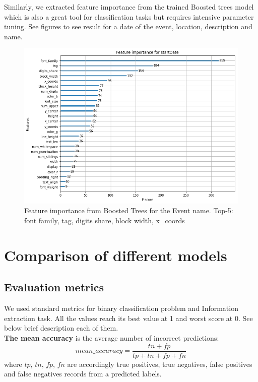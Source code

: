 Similarly, we extracted feature importance from the trained Boosted trees model which is also a great tool for classification tasks but requires intensive parameter tuning. See figures to see result for a date of the event, location, description and name.



\begin{figure}[h]
\begin{center}
\includegraphics[width=1.0\textwidth]{figures08/importanceDateboost}
\caption{Feature importance from Boosted Trees for the Event name. Top-5: font family, tag, digits share, block width, x\_coords}
\label{fig:importanceName}
\end{center}
\end{figure}


\section{Comparison of different models}

\subsection{Evaluation metrics}

We used standard metrics for binary classification problem and Information extraction task. All the values reach its best value at 1 and worst score at 0. See below brief description each of them.\\

\noindent\textbf{The mean accuracy} is the average number of incorrect predictions: 
$$ mean\_accuracy = \frac{tn + fp}{tp + tn + fp + fn}$$
where $tp$, $tn$, $fp$, $fn$ are accordingly true positives, true negatives, false positives and false negatives records from a predicted labels.\\

